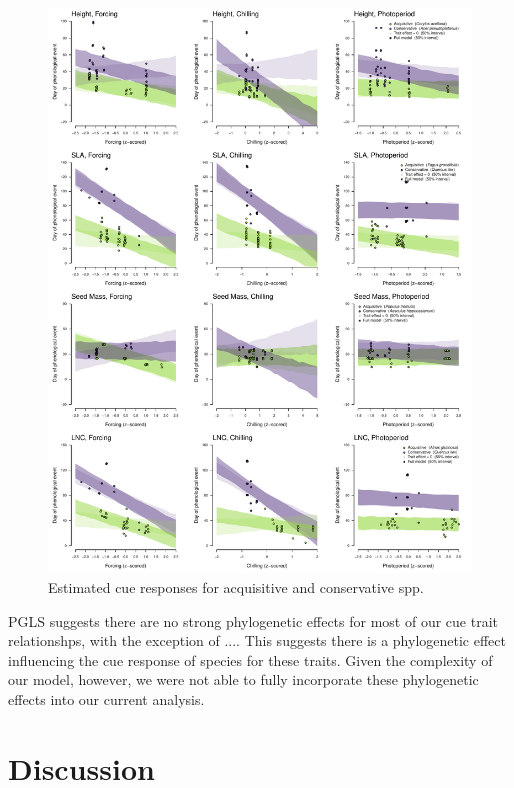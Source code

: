 \documentclass{article}\usepackage[]{graphicx}\usepackage[]{color}
\begin{document}
\begin{figure}[h!]
    \centering
 \includegraphics[width=\textwidth]{..//..//analyses/traits/figures/slopesConsAcqu.pdf} 
    \caption{Estimated cue responses for acquisitive and conservative spp.}
    \label{fig:slopes}
\end{figure}


PGLS suggests there are no strong phylogenetic effects for most of our cue trait relationshps, with the exception of .... This suggests there is a phylogenetic effect influencing the cue response of species for these traits. Given the complexity of our model, however, we were not able to fully incorporate these phylogenetic effects into our current analysis. 

\section{Discussion}
\end{document}
